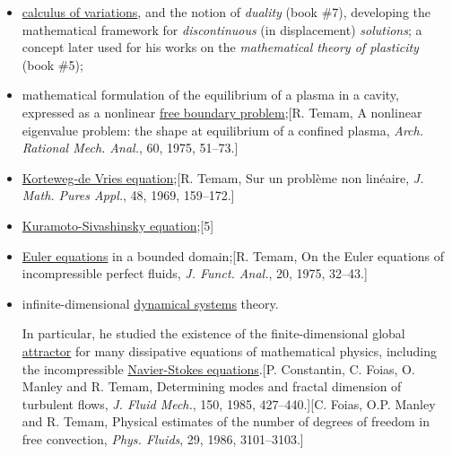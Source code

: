 \documentclass{book}
\numberwithin{equation}{section}
\begin{document}
\begin{itemize}
    \item \href{https://en.wikipedia.org/wiki/Calculus_of_variations}{calculus of variations}, and the notion of \textit{duality} (book \#7), developing the mathematical framework for \textit{discontinuous} (in displacement) \textit{solutions}; a concept later used for his works on the \textit{mathematical theory of plasticity} (book \#5);
    \item mathematical formulation of the equilibrium of a plasma in a cavity, expressed as a nonlinear \href{https://en.wikipedia.org/wiki/Free_boundary_problem}{free boundary problem};[R. Temam, A nonlinear eigenvalue problem: the shape at equilibrium of a confined plasma, \textit{Arch. Rational Mech. Anal.}, 60, 1975, 51--73.]
    \item \href{https://en.wikipedia.org/wiki/Korteweg-de_Vries_equation}{Korteweg-de Vries equation};[R. Temam, Sur un problème non linéaire, \textit{J. Math. Pures Appl.}, 48, 1969, 159--172.]
    \item \href{https://en.wikipedia.org/wiki/Kuramoto%E2%80%93Sivashinsky_equation}{Kuramoto-Sivashinsky equation};[5]
    \item \href{https://en.wikipedia.org/wiki/Euler_equations}{Euler equations} in a bounded domain;[R. Temam, On the Euler equations of incompressible perfect fluids, \textit{J. Funct. Anal.}, 20, 1975, 32--43.]
    \item infinite-dimensional \href{https://en.wikipedia.org/wiki/Dynamical_systems}{dynamical systems} theory.
    
    In particular, he studied the existence of the finite-dimensional global \href{https://en.wikipedia.org/wiki/Attractor}{attractor} for many dissipative equations of mathematical physics, including the incompressible \href{https://en.wikipedia.org/wiki/Navier-Stokes_equations}{Navier-Stokes equations}.[P. Constantin, C. Foias, O. Manley and R. Temam, Determining modes and fractal dimension of turbulent flows, \textit{J. Fluid Mech.}, 150, 1985, 427--440.][C. Foias, O.P. Manley and R. Temam, Physical estimates of the number of degrees of freedom in free convection, \textit{Phys. Fluids}, 29, 1986, 3101--3103.]
    

\end{itemize}
\end{document}

